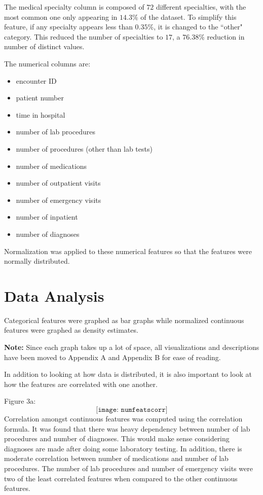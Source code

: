 \documentclass{article}
\begin{document}
The medical specialty column is composed of $72$ different specialties, with the most common one only appearing in $14.3\%$ of the dataset. To simplify this feature, if any specialty appears less than $0.35\%$, it is changed to the ``other" category. This reduced the number of specialties to $17$, a $76.38\%$ reduction in number of distinct values. 

The numerical columns are: 
\begin{multicols}{2}
\begin{itemize} \item encounter ID \item patient number \item time in hospital \item number of lab procedures \item number of procedures (other than lab tests) \item number of medications \item number of outpatient visits \item number of emergency visits \item number of inpatient \item number of diagnoses \end{itemize} \end{multicols} 

Normalization was applied to these numerical features so that the features were normally distributed.  

\newpage
\section{Data Analysis} 

Categorical features were graphed as bar graphs while normalized continuous features were graphed as density estimates. 

\textbf{Note: } Since each graph takes up a lot of space, all visualizations and descriptions have been moved to Appendix A and Appendix B for ease of reading. 
 
In addition to looking at how data is distributed, it is also important to look at how the features are correlated with one another. 

Figure 3a: $$ \texttt{[image: numfeatscorr]} $$ 
Correlation amongst continuous features was computed using the correlation formula. It was found that there was heavy dependency between number of lab procedures and number of diagnoses. This would make sense considering diagnoses are made after doing some laboratory testing. In addition, there is moderate correlation between number of medications and number of lab procedures. The number of lab procedures and number of emergency visits were two of the least correlated features when compared to the other continuous features. 
\end{document}
